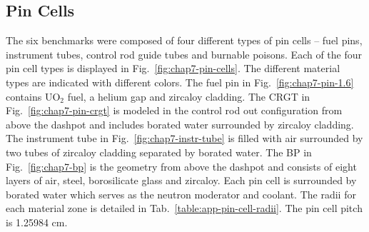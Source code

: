 \subsection{Pin Cells}
\label{subsec:chap7-pin-cells}

The six benchmarks were composed of four different types of pin cells -- fuel pins, instrument tubes, control rod guide tubes and burnable poisons. Each of the four pin cell types is displayed in Fig.~\ref{fig:chap7-pin-cells}. The different material types are indicated with different colors. The fuel pin in Fig.~\ref{fig:chap7-pin-1.6} contains UO$_2$ fuel, a helium gap and zircaloy cladding. The \ac{CRGT} in Fig.~\ref{fig:chap7-pin-crgt} is modeled in the control rod out configuration from above the dashpot and includes borated water surrounded by zircaloy cladding. The instrument tube in Fig.~\ref{fig:chap7-instr-tube} is filled with air surrounded by two tubes of zircaloy cladding separated by borated water. The \ac{BP} in Fig.~\ref{fig:chap7-bp} is the geometry from above the dashpot and consists of eight layers of air, steel, borosilicate glass and zircaloy. Each pin cell is surrounded by borated water which serves as the neutron moderator and coolant. The radii for each material zone is detailed in Tab.~\ref{table:app-pin-cell-radii}. The pin cell pitch is 1.25984 cm.


